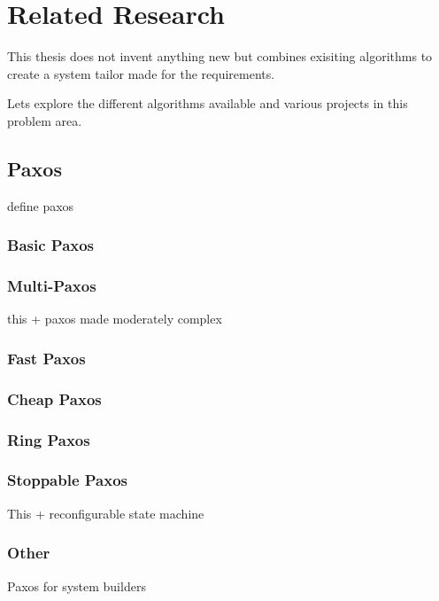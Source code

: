 \chapter{Related Research}
\label{chapter:related.research}

This thesis does not invent anything new but combines exisiting
algorithms to create a system tailor made for the requirements.

Lets explore the different algorithms available and various projects in this
problem area.

\section{Paxos}

{define paxos}

\subsection{Basic Paxos}

\subsection{Multi-Paxos}

this + paxos made moderately complex

\subsection{Fast Paxos}

\subsection{Cheap Paxos}

\subsection{Ring Paxos}

\subsection{Stoppable Paxos}

This + reconfigurable state machine

\subsection{Other}

Paxos for system builders

